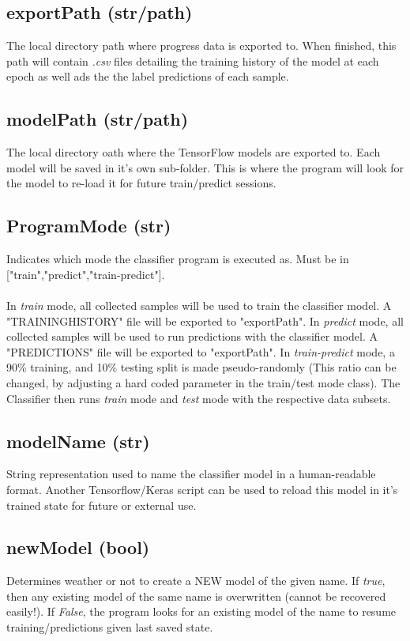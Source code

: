 \documentclass[12pt,letterpaper]{article}
\begin{document}
\subsection{exportPath (str/path)}
The local directory path where progress data is exported to. When finished, this path will contain \textit{.csv} files detailing the training history of the model at each epoch as well ads the the label predictions of each sample.

\subsection{modelPath (str/path)}
The local directory oath where the TensorFlow models are exported to. Each model will be saved in it's own sub-folder. This is where the program will look for the model to re-load it for future train/predict sessions. 

\subsection{ProgramMode (str)}
Indicates which mode the classifier program is executed as. Must be in ["train","predict","train-predict"].
\paragraph*{}In \textit{train} mode, all collected samples will be used to train the classifier model. A "TRAININGHISTORY" file will be exported to "exportPath".  In \textit{predict} mode, all collected samples will be used to run predictions with the classifier model. A "PREDICTIONS" file will be exported to "exportPath". In \textit{train-predict} mode, a 90\% training, and 10\% testing split is made pseudo-randomly (This ratio can be changed, by adjusting a hard coded parameter in the train/test mode class). The Classifier then runs \textit{train} mode and \textit{test} mode with the respective data subsets.

\subsection{modelName (str)}
String representation used to name the classifier model in a human-readable format. Another Tensorflow/Keras script can be used to reload this model in it's trained state for future or external use.

\subsection{newModel (bool)}
Determines weather or not to create a NEW model of the given name. If \textit{true}, then any existing model of the same name is overwritten (cannot be recovered easily!). If \textit{False}, the program looks for an existing model of the name to resume training/predictions given last saved state.
\end{document}
